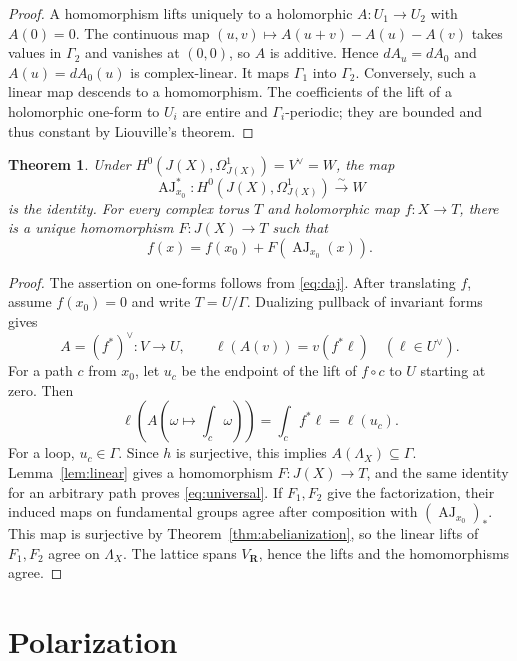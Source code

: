 \documentclass[11pt]{article}
\numberwithin{equation}{section}
\newtheorem{theorem}{Theorem}[section]
\theoremstyle{definition}
\newcommand{\R}{\mathbf R}
\newcommand{\AJ}{\operatorname{AJ}}
\begin{document}
\begin{proof}
A homomorphism lifts uniquely to a holomorphic $A:U_1\to U_2$ with
$A(0)=0$. The continuous map
$(u,v)\mapsto A(u+v)-A(u)-A(v)$ takes values in $\Gamma_2$ and vanishes
at $(0,0)$, so $A$ is additive. Hence $dA_u=dA_0$ and $A(u)=dA_0(u)$
is complex-linear. It maps $\Gamma_1$ into $\Gamma_2$. Conversely, such
a linear map descends to a homomorphism. The coefficients of the lift
of a holomorphic one-form to $U_i$ are entire and $\Gamma_i$-periodic;
they are bounded and thus constant by Liouville's theorem.
\end{proof}

\begin{theorem}\label{thm:universal}
Under $H^0(J(X),\Omega_{J(X)}^1)=V^\vee=W$, the map
\[
 \AJ_{x_0}^*:H^0(J(X),\Omega_{J(X)}^1)\xrightarrow{\sim}W
\]
is the identity. For every complex torus $T$ and holomorphic map
$f:X\to T$, there is a unique homomorphism $F:J(X)\to T$ such that
\begin{equation}\label{eq:universal}
 f(x)=f(x_0)+F(\AJ_{x_0}(x)).
\end{equation}
\end{theorem}

\begin{proof}
The assertion on one-forms follows from \eqref{eq:daj}.
After translating $f$, assume $f(x_0)=0$ and write $T=U/\Gamma$.
Dualizing pullback of invariant forms gives
\[
 A=(f^*)^\vee:V\longrightarrow U,\qquad
 \ell(A(v))=v(f^*\ell)\quad(\ell\in U^\vee).
\]
For a path $c$ from $x_0$, let $u_c$ be the endpoint of the lift of
$f\circ c$ to $U$ starting at zero. Then
\[
 \ell\left(A\left(\omega\longmapsto\int_c\omega\right)\right)
 =\int_c f^*\ell=\ell(u_c).
\]
For a loop, $u_c\in\Gamma$. Since $h$ is surjective, this implies
$A(\Lambda_X)\subseteq\Gamma$. Lemma~\ref{lem:linear} gives a
homomorphism $F:J(X)\to T$, and the same identity for an arbitrary
path proves \eqref{eq:universal}.
If $F_1,F_2$ give the factorization, their induced maps on fundamental
groups agree after composition with $(\AJ_{x_0})_*$. This map is
surjective by Theorem~\ref{thm:abelianization}, so the linear lifts of
$F_1,F_2$ agree on $\Lambda_X$. The lattice spans $V_{\R}$, hence the
lifts and the homomorphisms agree.
\end{proof}

\section{Polarization}
\end{document}
